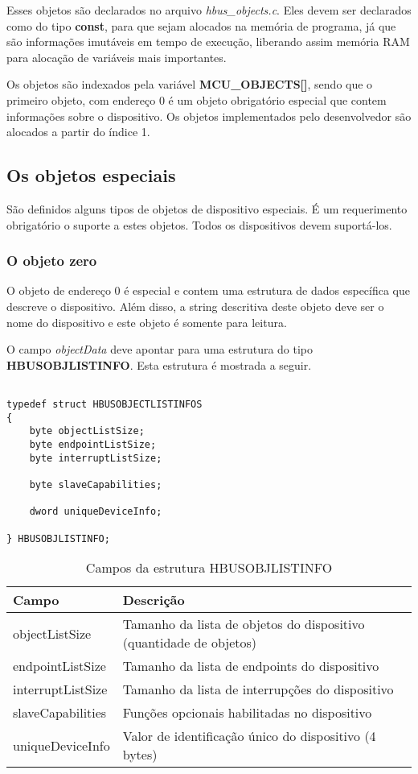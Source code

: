 Esses objetos são declarados no arquivo \textit{hbus\_objects.c}. Eles devem ser declarados como do tipo \textbf{const}, para que sejam alocados na memória de programa, já que são informações imutáveis em tempo de execução, liberando assim memória RAM para alocação de variáveis mais importantes.

Os objetos são indexados pela variável \textbf{MCU\_OBJECTS[]}, sendo que o primeiro objeto, com endereço 0 é um objeto obrigatório especial que contem informações sobre o dispositivo. Os objetos implementados pelo desenvolvedor são alocados a partir do índice 1.

\subsection{Os objetos especiais}

São definidos alguns tipos de objetos de dispositivo especiais. É um requerimento obrigatório o suporte a estes objetos. Todos os dispositivos devem suportá-los.

\subsubsection*{O objeto zero}

O objeto de endereço 0 é especial e contem uma estrutura de dados específica que descreve o dispositivo. Além disso, a string descritiva deste objeto deve ser o nome do dispositivo e este objeto é somente para leitura.

O campo \textit{objectData} deve apontar para uma estrutura do tipo \textbf{HBUSOBJLISTINFO}. Esta estrutura é mostrada a seguir.

\begin{verbatim}

typedef struct HBUSOBJECTLISTINFOS
{
	byte objectListSize;
	byte endpointListSize;
	byte interruptListSize;
	
	byte slaveCapabilities;
	
	dword uniqueDeviceInfo;
	
} HBUSOBJLISTINFO;

\end{verbatim}

\begin{table}[H]
\centering
\caption{Campos da estrutura HBUSOBJLISTINFO}
\begin{tabular}{l p{13cm}}

\hline
Campo					&	Descrição\\
\hline
objectListSize			&	Tamanho da lista de objetos do dispositivo (quantidade de objetos)\\
endpointListSize			&	Tamanho da lista de endpoints do dispositivo\\
interruptListSize		&	Tamanho da lista de interrupções do dispositivo\\
slaveCapabilities		&	Funções opcionais habilitadas no dispositivo\\
uniqueDeviceInfo			&	Valor de identificação único do dispositivo (4 bytes)\\
\hline

\end{tabular}
\end{table}

